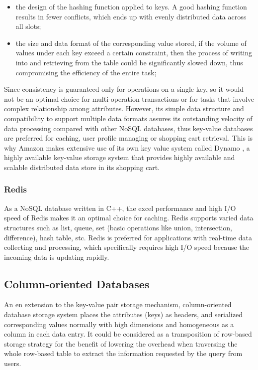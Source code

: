 \begin{itemize}
	\item the design of the hashing function applied to keys. A good hashing function results in fewer conflicts, which ends up with evenly distributed data across all slots;
	\item the size and data format of the corresponding value stored, if the volume of values under each key exceed a certain constraint, then the process of writing into and retrieving from the table could be significantly slowed down, thus compromising the efficiency of the entire task;
\end{itemize}

\noindent Since consistency is guaranteed only for operations on a single key, so it would not be an optimal choice for multi-operation transactions or for tasks that involve complex relationship among attributes. However, its simple data structure and compatibility to support multiple data formats assures its outstanding velocity of data processing compared with other  NoSQL databases, thus key-value databases are preferred for caching, user profile managing or shopping cart retrieval. This is why Amazon makes extensive use of its own key value system called Dynamo \cite{DBLP:journals/corr/MoniruzzamanH13}, a highly available key-value storage
system that provides highly available and scalable
distributed data store in its shopping cart. 

\subsubsection{Redis}\mbox{}\mbox{}

\noindent As a NoSQL database written in C++, the excel performance and high I/O speed of Redis makes it an optimal choice for 
caching. Redis supports varied data structures such as list, queue, set (basic operations like union, intersection, difference), hash table, stc. 
Redis is preferred for applications with real-time data collecting and processing, which specifically requires high I/O speed because the incoming data is updating rapidly.

\subsection{Column-oriented Databases}

An en extension to the key-value pair storage mechanism, column-oriented database storage system places the attributes (keys) as headers, and serialized corresponding values normally with high dimensions and homogeneous as a column in each data entry. It could be considered as a transposition of row-based storage strategy for the benefit of lowering the overhead when traversing the whole row-based table to extract the information requested by the query from users. 


